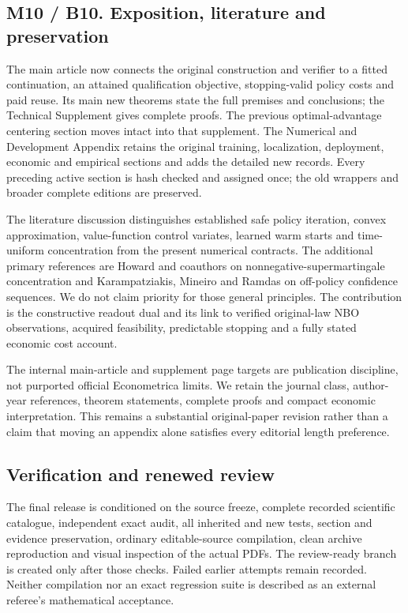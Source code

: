 \documentclass[ecta,nameyear,draft]{econsocart}
\begin{document}
\hypertarget{m10-b10.-exposition-literature-and-preservation}{%
\subsection{M10 / B10. Exposition, literature and
preservation}\label{m10-b10.-exposition-literature-and-preservation}}

The main article now connects the original construction and verifier to
a fitted continuation, an attained qualification objective,
stopping-valid policy costs and paid reuse. Its main new theorems state
the full premises and conclusions; the Technical Supplement gives
complete proofs. The previous optimal-advantage centering section moves
intact into that supplement. The Numerical and Development Appendix
retains the original training, localization, deployment, economic and
empirical sections and adds the detailed new records. Every preceding
active section is hash checked and assigned once; the old wrappers and
broader complete editions are preserved.

The literature discussion distinguishes established safe policy
iteration, convex approximation, value-function control variates,
learned warm starts and time-uniform concentration from the present
numerical contracts. The additional primary references are Howard and
coauthors on nonnegative-supermartingale concentration and
Karampatziakis, Mineiro and Ramdas on off-policy confidence sequences.
We do not claim priority for those general principles. The contribution
is the constructive readout dual and its link to verified original-law
NBO observations, acquired feasibility, predictable stopping and a fully
stated economic cost account.

The internal main-article and supplement page targets are publication
discipline, not purported official Econometrica limits. We retain the
journal class, author-year references, theorem statements, complete
proofs and compact economic interpretation. This remains a substantial
original-paper revision rather than a claim that moving an appendix
alone satisfies every editorial length preference.

\hypertarget{verification-and-renewed-review}{%
\subsection{Verification and renewed
review}\label{verification-and-renewed-review}}

The final release is conditioned on the source freeze, complete recorded
scientific catalogue, independent exact audit, all inherited and new
tests, section and evidence preservation, ordinary editable-source
compilation, clean archive reproduction and visual inspection of the
actual PDFs. The review-ready branch is created only after those checks.
Failed earlier attempts remain recorded. Neither compilation nor an
exact regression suite is described as an external referee's
mathematical acceptance.
\end{document}
